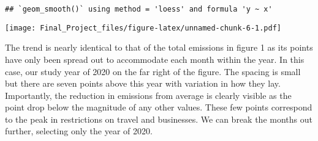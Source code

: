 \documentclass[
]{article}
\begin{document}
\begin{verbatim}
## `geom_smooth()` using method = 'loess' and formula 'y ~ x'
\end{verbatim}

\texttt{[image: Final\_Project\_files/figure-latex/unnamed-chunk-6-1.pdf]}

The trend is nearly identical to that of the total emissions in figure 1
as its points have only been spread out to accommodate each month within
the year. In this case, our study year of 2020 on the far right of the
figure. The spacing is small but there are seven points above this year
with variation in how they lay. Importantly, the reduction in emissions
from average is clearly visible as the point drop below the magnitude of
any other values. These few points correspond to the peak in
restrictions on travel and businesses. We can break the months out
further, selecting only the year of 2020.
\end{document}
